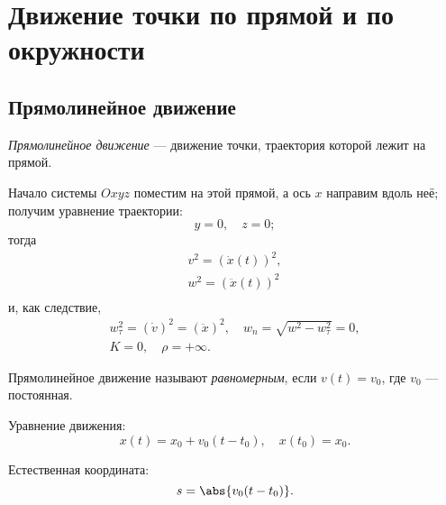 \section{Движение точки по прямой и по окружности}

\subsection{Прямолинейное движение}

\begin{definition}
  \textit{Прямолинейное движение} --- движение точки, траектория которой лежит
  на прямой.
\end{definition}

Начало системы $Oxyz$ поместим на этой прямой, а ось $x$ направим вдоль неё;
получим уравнение траектории:
\begin{equation*}
  y = 0, \quad z = 0;
\end{equation*}
тогда
\begin{equation*}
  \begin{gathered}
    v^2 = (\dot{x}(t))^2, \\
    w^2 = (\ddot{x}(t))^2 \\
  \end{gathered}
\end{equation*}
и, как следствие,
\begin{equation*}
  \begin{gathered}
    w_\tau^2 = (\dot{v})^2 = (\ddot{x})^2, \quad
      w_n = \sqrt{w^2 - w_\tau^2} = 0, \\
    K = 0, \quad \rho = +\infty.
  \end{gathered}
\end{equation*}

\begin{definition}
  Прямолинейное движение называют \textit{равномерным}, если $v(t) = v_0$,
  где $v_0$ --- постоянная.

  Уравнение движения:
  \begin{equation*}
    x(t) = x_0 + v_0 (t - t_0), \quad x(t_0) = x_0.
  \end{equation*}

  Естественная координата:
  \begin{equation*}
    s = \abs{v_0 (t - t_0)}.
  \end{equation*}
\end{definition}

